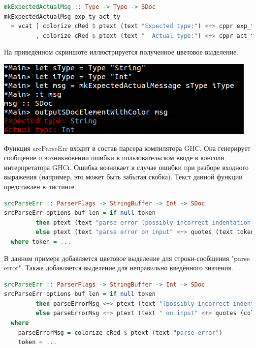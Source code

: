 \begin{lstlisting}[language=Haskell, caption=Реализация функции с изменениями]
mkExpectedActualMsg :: Type -> Type -> SDoc
mkExpectedActualMsg exp_ty act_ty
  = vcat [ colorize cRed $ ptext (text "Expected type:") <+> cppr exp_ty
         , colorize cRed $ ptext (text "  Actual type:") <+> cppr act_ty ]
\end{lstlisting}

На приведённом скриншоте иллюстрируется полученное цветовое выделение.

\centerline{\includegraphics{img/example1.png}}

Функция srcParseErr входит в состав парсера компилятора GHC. Она генерирует сообщение о возникновении ошибки в пользовательском вводе в консоли интерпретатора GHCi. Ошибка возникает в случае ошибки при разборе входного выражения (например, это может быть забытая скобка). Текст данной функции представлен в листинге.

\begin{lstlisting}[language=Haskell]
srcParseErr :: ParserFlags -> StringBuffer -> Int -> SDoc
srcParseErr options buf len = if null token
         then ptext (text "parse error (possibly incorrect indentation or mismatched brackets)")
         else ptext (text "parse error on input" <+> quotes (text token))
  where token = ...    
\end{lstlisting}
\newpage
В данном примере добавляется цветовое выделение для строки-сообщения "parse error". Также добавляется выделение для неправильно введённого значения.

\begin{lstlisting}[language=Haskell]
srcParseErr :: ParserFlags -> StringBuffer -> Int -> SDoc
srcParseErr options buf len = if null token
         then parseErrorMsg <+> ptext (text "(possibly incorrect indentation or mismatched brackets)")
         else parseErrorMsg <+> ptext (text " on input" <+> quotes (colorize CBlue $ (text token))
  where 
    parseErrorMsg = colorize cRed $ ptext (text "parse error")
    token = ...    
\end{lstlisting}

